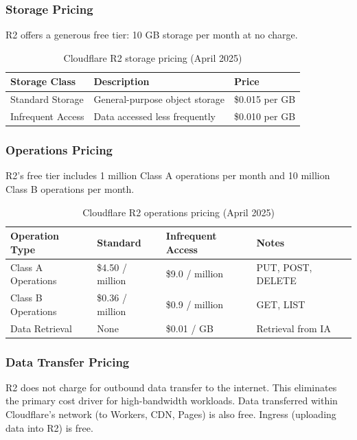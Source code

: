 \subsubsection{Storage Pricing}
R2 offers a generous free tier: 10 GB storage per month at no charge.

\begin{table}[H]
\centering
\caption{Cloudflare R2 storage pricing (April 2025)}
\label{tab:r2-storage-pricing}
\begin{tabular}{p{5cm}p{5.5cm}p{4cm}}
\hline
\textbf{Storage Class} & \textbf{Description} & \textbf{Price} \\
\hline
Standard Storage & General-purpose object storage & \$0.015 per GB \\
Infrequent Access & Data accessed less frequently & \$0.010 per GB \\
\hline
\end{tabular}
\end{table}


\subsubsection{Operations Pricing}
R2's free tier includes 1 million Class A operations per month and 10 million Class B operations per month.

\begin{table}[H]
\centering
\caption{Cloudflare R2 operations pricing (April 2025)}
\label{tab:r2-operations-pricing}
\begin{tabular}{p{3.5cm}p{3cm}p{3.5cm}p{4cm}}
\hline
\textbf{Operation Type} & \textbf{Standard} & \textbf{Infrequent Access} & \textbf{Notes} \\
\hline
Class A Operations & \$4.50 / million & \$9.0 / million & PUT, POST, DELETE \\
Class B Operations & \$0.36 / million & \$0.9 / million & GET, LIST \\
Data Retrieval & None & \$0.01 / GB & Retrieval from IA \\
\hline
\end{tabular}
\end{table}


\subsubsection{Data Transfer Pricing}
R2 does not charge for outbound data transfer to the internet. This eliminates the primary cost driver for high-bandwidth workloads. Data transferred within Cloudflare's network (to Workers, CDN, Pages) is also free. Ingress (uploading data into R2) is free.

